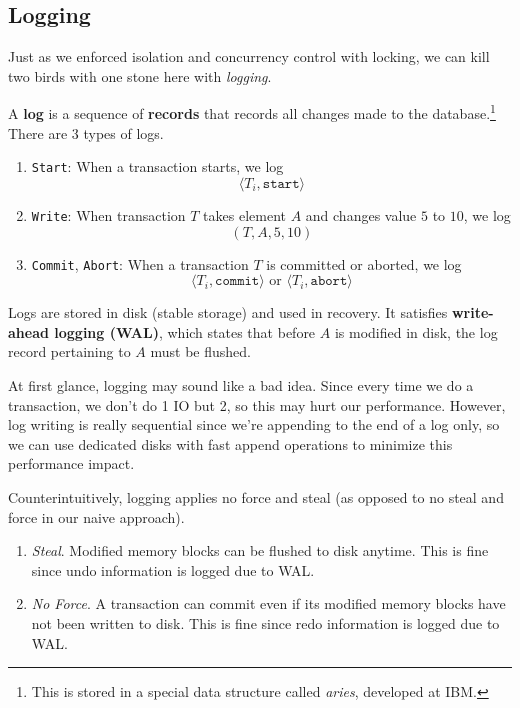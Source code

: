   \subsection{Logging} 

    Just as we enforced isolation and concurrency control with locking, we can kill two birds with one stone here with \textit{logging}. 

    \begin{definition}[Log]
      A \textbf{log} is a sequence of \textbf{records} that records all changes made to the database.\footnote{This is stored in a special data structure called \textit{aries}, developed at IBM.} There are 3 types of logs.
      \begin{enumerate}
        \item \texttt{Start}: When a transaction starts, we log 
          \begin{equation}
            \langle T_i, \texttt{start} \rangle
          \end{equation}
        \item \texttt{Write}: When transaction $T$ takes element $A$ and changes value $5$ to $10$, we log 
          \begin{equation}
            (T, A, 5, 10)
          \end{equation}
        \item \texttt{Commit}, \texttt{Abort}: When a transaction $T$ is committed or aborted, we log 
          \begin{equation}
            \langle T_i , \texttt{commit} \rangle \text{ or } \langle T_i , \texttt{abort} \rangle
          \end{equation}
      \end{enumerate}
      Logs are stored in disk (stable storage) and used in recovery. 
      It satisfies \textbf{write-ahead logging (WAL)}, which states that before $A$ is modified in disk, the log record pertaining to $A$ must be flushed. 
    \end{definition}

    At first glance, logging may sound like a bad idea. Since every time we do a transaction, we don't do 1 IO but 2, so this may hurt our performance. However, log writing is really sequential since we're appending to the end of a log only, so we can use dedicated disks with fast append operations to minimize this performance impact. 

    \begin{theorem}
      Counterintuitively, logging applies no force and steal (as opposed to no steal and force in our naive approach). 
      \begin{enumerate}
        \item \textit{Steal}. Modified memory blocks can be flushed to disk anytime. This is fine since undo information is logged due to WAL. 
        \item \textit{No Force}. A transaction can commit even if its modified memory blocks have not been written to disk. This is fine since redo information is logged due to WAL. 
      \end{enumerate}
    \end{theorem} 

